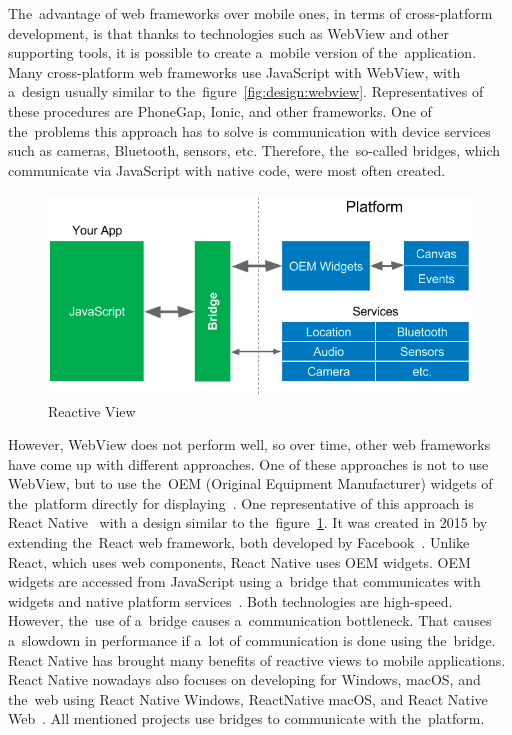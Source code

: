 The~advantage of web frameworks over mobile ones, in terms of cross-platform development, is that thanks to technologies such as WebView and other supporting tools, it is possible to create a~mobile version of the~application.
Many cross-platform web frameworks use JavaScript with WebView, with a~design usually similar to the~figure~\ref{fig:design:webview}.
Representatives of these procedures are PhoneGap, Ionic, and other frameworks.
One of the~problems this approach has to solve is communication with device services such as cameras, Bluetooth, sensors, etc.
Therefore, the~so-called bridges, which communicate via JavaScript with native code, were most often created.

\begin{figure}
    \centering
    \includegraphics[width=1\linewidth]{assets/design/reactive.png}
    \caption{Reactive View~\cite{leler_2017_whats}}
    \label{fig:design:reactiveview}
\end{figure}

However, WebView does not perform well, so over time, other web frameworks have come up with different approaches.
One of these approaches is not to use WebView, but to use the~OEM (Original Equipment Manufacturer) widgets of the~platform directly for displaying~\cite{leler_2017_whats}.
One representative of this approach is React Native~\cite{a2022_react} with a design similar to the~figure~\ref{fig:design:reactiveview}.
It was created in 2015 by extending the~React web framework, both developed by Facebook~\cite{a2022_react}.
Unlike React, which uses web components, React Native uses OEM widgets.
OEM widgets are accessed from JavaScript using a~bridge that communicates with widgets and native platform services~\cite{leler_2017_whats}.
Both technologies are high-speed.
However, the~use of a~bridge causes a~communication bottleneck.
That causes a~slowdown in performance if a~lot of communication is done using the~bridge.
React Native has brought many benefits of reactive views to mobile applications.
React Native nowadays also focuses on developing for Windows, macOS, and the~web using React Native Windows, ReactNative macOS, and React Native Web~\cite{a2022_react}.
All mentioned projects use bridges to communicate with the~platform.

